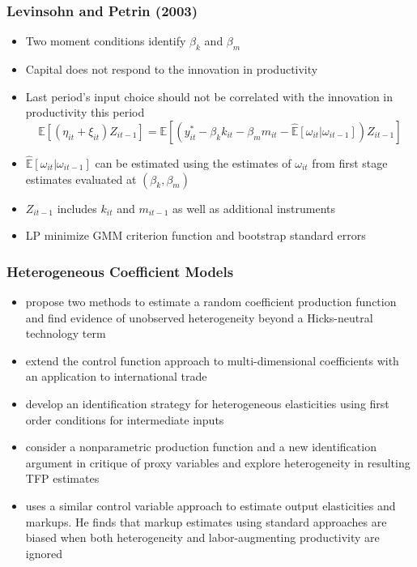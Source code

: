\documentclass{beamer}
\begin{document}

\begin{frame}
\frametitle{Levinsohn and Petrin (2003)}
\begin{itemize}
	\item Two moment conditions identify $\beta_{k}$ and $\beta_{m}$
	\item Capital does not respond to the innovation in productivity 
	\item Last period's input choice should not be correlated with the innovation in productivity this period
	\begin{equation}
	\mathbb{E}[(\eta_{it}+\xi_{it})Z_{it-1}]=\mathbb{E}[(y_{it}^{*}-\beta_{k}k_{it}-\beta_{m}m_{it}-\hat{\mathbb{E}}[\omega_{it}|\omega_{it-1}])Z_{it-1}]
	\end{equation}
	\item $\hat{\mathbb{E}}[\omega_{it}|\omega_{it-1}]$ can be estimated using the estimates of $\omega_{it}$ from first stage estimates evaluated at $(\beta_{k}, \beta_{m})$
	\item $Z_{it-1}$ includes $k_{it}$ and $m_{it-1}$ as well as additional instruments
	\item LP minimize GMM criterion function and bootstrap standard errors 
\end{itemize}
\end{frame}



\begin{frame}
\frametitle{Heterogeneous Coefficient Models}
\begin{itemize}
	\item \textcite{Kasahara2015} propose two methods to estimate a random coefficient production function and find evidence of unobserved heterogeneity beyond a Hicks-neutral technology term
	\item \textcite{balat} extend the control function approach to multi-dimensional coefficients with an application to international trade
	\item \textcite{Li2017} develop an identification strategy for heterogeneous elasticities using first order conditions for intermediate inputs
	\item \textcite{Gandhi2020} consider a nonparametric production function and a new identification argument in critique of proxy variables and explore heterogeneity in resulting TFP estimates
	\item \textcite{mert} uses a similar control variable approach to estimate output elasticities and markups. He finds that markup estimates using standard approaches are biased when both heterogeneity and labor-augmenting productivity are ignored
\end{itemize}
\end{frame}
\end{document}
